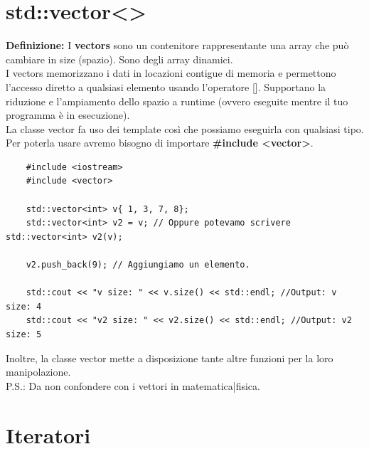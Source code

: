 


\section{std::vector<>}

\textsf{\small \textbf{Definizione:} I \textbf{vectors} sono un contenitore rappresentante una array che può cambiare in size (spazio). Sono degli array dinamici.} \\

\textsf{\small I vectors memorizzano i dati in locazioni contigue di memoria e permettono l'accesso diretto a qualsiasi elemento usando l'operatore []. Supportano la riduzione e l'ampiamento dello spazio a runtime (ovvero eseguite mentre il tuo programma è in esecuzione).} \\

\textsf{\small La classe vector fa uso dei template così che possiamo eseguirla con qualsiasi tipo. Per poterla usare avremo bisogno di importare \textbf{\#include <vector>}.} \\

\begin{lstlisting}
	#include <iostream>
	#include <vector>
	
	std::vector<int> v{ 1, 3, 7, 8};
	std::vector<int> v2 = v; // Oppure potevamo scrivere std::vector<int> v2(v);
	
	v2.push_back(9); // Aggiungiamo un elemento.
	
	std::cout << "v size: " << v.size() << std::endl; //Output: v size: 4
	std::cout << "v2 size: " << v2.size() << std::endl; //Output: v2 size: 5
\end{lstlisting}

\textsf{\small Inoltre, la classe vector mette a disposizione tante altre funzioni per la loro manipolazione.} \\

\textsf{\small P.S.: Da non confondere con i vettori in matematica|fisica.} \break


\newpage

\section{Iteratori}


